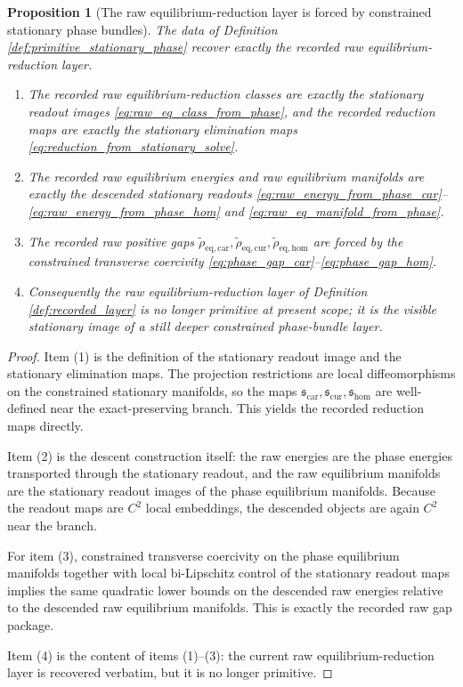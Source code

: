\documentclass[11pt]{article}
\newcommand{\RawCarGap}{\widetilde\rho_{\mathrm{eq,car}}}
\newcommand{\RawCurGap}{\widetilde\rho_{\mathrm{eq,cur}}}
\newcommand{\RawHomGap}{\widetilde\rho_{\mathrm{eq,hom}}}
\newcommand{\TensorStationarySolve}{\mathfrak s_{\mathrm{car}}}
\newcommand{\CurStationarySolve}{\mathfrak s_{\mathrm{cur}}}
\newcommand{\HomStationarySolve}{\mathfrak s_{\mathrm{hom}}}
\newtheorem{proposition}{Proposition}
\begin{document}
\begin{proposition}[The raw equilibrium-reduction layer is forced by constrained stationary phase bundles]
\label{prop:equilibrium_from_phase}
The data of Definition \ref{def:primitive_stationary_phase} recover exactly the recorded raw equilibrium-reduction layer.
\begin{enumerate}
    \item The recorded raw equilibrium-reduction classes are exactly the stationary readout images \eqref{eq:raw_eq_class_from_phase}, and the recorded reduction maps are exactly the stationary elimination maps \eqref{eq:reduction_from_stationary_solve}.
    \item The recorded raw equilibrium energies and raw equilibrium manifolds are exactly the descended stationary readouts \eqref{eq:raw_energy_from_phase_car}--\eqref{eq:raw_energy_from_phase_hom} and \eqref{eq:raw_eq_manifold_from_phase}.
    \item The recorded raw positive gaps \(\RawCarGap,\RawCurGap,\RawHomGap\) are forced by the constrained transverse coercivity \eqref{eq:phase_gap_car}--\eqref{eq:phase_gap_hom}.
    \item Consequently the raw equilibrium-reduction layer of Definition \ref{def:recorded_layer} is no longer primitive at present scope; it is the visible stationary image of a still deeper constrained phase-bundle layer.
\end{enumerate}
\end{proposition}

\begin{proof}
Item (1) is the definition of the stationary readout image and the stationary elimination maps. The projection restrictions are local diffeomorphisms on the constrained stationary manifolds, so the maps \(\TensorStationarySolve,\CurStationarySolve,\HomStationarySolve\) are well-defined near the exact-preserving branch. This yields the recorded reduction maps directly.

Item (2) is the descent construction itself: the raw energies are the phase energies transported through the stationary readout, and the raw equilibrium manifolds are the stationary readout images of the phase equilibrium manifolds. Because the readout maps are \(C^2\) local embeddings, the descended objects are again \(C^2\) near the branch.

For item (3), constrained transverse coercivity on the phase equilibrium manifolds together with local bi-Lipschitz control of the stationary readout maps implies the same quadratic lower bounds on the descended raw energies relative to the descended raw equilibrium manifolds. This is exactly the recorded raw gap package.

Item (4) is the content of items (1)--(3): the current raw equilibrium-reduction layer is recovered verbatim, but it is no longer primitive.
\end{proof}
\end{document}
